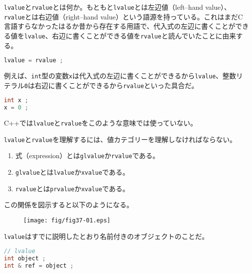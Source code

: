 \clearpage
{}

\texttt{lvalue}と\texttt{rvalue}とは何か。もともと\texttt{lvalue}とは左辺値（left--hand value）、\texttt{rvalue}とは右辺値（right--hand value）という語源を持っている。これはまだC言語すらなかったはるか昔から存在する用語で、代入式の左辺に書くことができる値を\texttt{lvalue}、右辺に書くことができる値を\texttt{rvalue}と読んでいたことに由来する。

\begin{lstlisting}[language={C++}]
lvalue = rvalue ;
\end{lstlisting}

例えば、\texttt{int}型の変数\texttt{x}は代入式の左辺に書くことができるから\texttt{lvalue}、整数リテラル\texttt{0}は右辺に書くことができるから\texttt{rvalue}といった具合だ。

\begin{lstlisting}[language={C++}]
int x ;
x = 0 ;
\end{lstlisting}

C++では\texttt{lvalue}と\texttt{rvalue}をこのような意味では使っていない。

\texttt{lvalue}と\texttt{rvalue}を理解するには、値カテゴリーを理解しなければならない。

\begin{enumerate}
\def\labelenumi{\arabic{enumi}.}
\item
  式（expression）とは\texttt{glvalue}か\texttt{rvalue}である。
\item
  \texttt{glvalue}とは\texttt{lvalue}か\texttt{xvalue}である。
\item
  \texttt{rvalue}とは\texttt{prvalue}か\texttt{xvalue}である。
\end{enumerate}

この関係を図示すると以下のようになる。

\begin{figure}[htbp]
  \centering
  \texttt{[image: fig/fig37-01.eps]}
  \label{fig:37-01}
\end{figure}


\texttt{lvalue}はすでに説明したとおり名前付きのオブジェクトのことだ。

\begin{lstlisting}[language={C++}]
// lvalue
int object ;
int & ref = object ;
\end{lstlisting}

